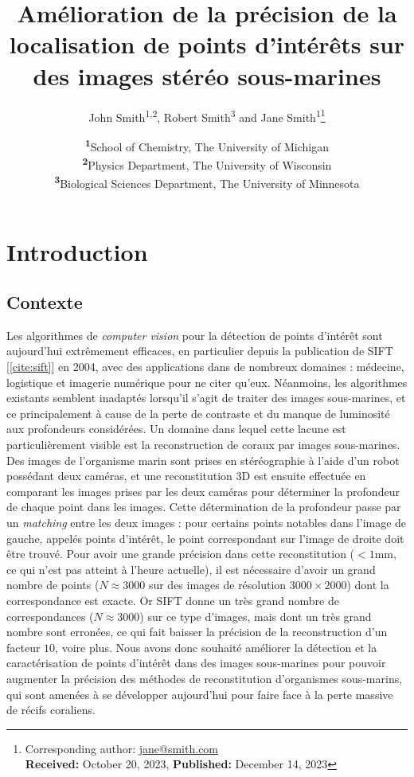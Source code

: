 \documentclass[
	a4paper, %
	10pt, %
	unnumberedsections, %
	twoside, %
]{LTJournalArticle}
\title{Amélioration de la précision de la localisation de points d'intérêts sur des images stéréo sous-marines} %
\author{%
	John Smith\textsuperscript{1,2}, Robert Smith\textsuperscript{3} and Jane Smith\textsuperscript{1}\thanks{Corresponding author: \href{mailto:jane@smith.com}{jane@smith.com}\\ \textbf{Received:} October 20, 2023, \textbf{Published:} December 14, 2023}
}
\date{\footnotesize\textsuperscript{\textbf{1}}School of Chemistry, The University of Michigan\\ \textsuperscript{\textbf{2}}Physics Department, The University of Wisconsin\\ \textsuperscript{\textbf{3}}Biological Sciences Department, The University of Minnesota}
\begin{document}
\maketitle %


\section{Introduction}

\subsection{Contexte}

Les algorithmes de \textit{computer vision} pour la détection de points d'intérêt sont aujourd'hui extrêmement efficaces, en particulier depuis la publication de SIFT [\ref{cite:sift}] en 2004, avec des applications dans de nombreux domaines : médecine, logistique et imagerie numérique pour ne citer qu'eux.
Néanmoins, les algorithmes existants semblent inadaptés lorsqu'il s'agit de traiter des images sous-marines, et ce principalement à cause de la perte de contraste et du manque de luminosité aux profondeurs considérées.
Un domaine dans lequel cette lacune est particulièrement visible est la reconstruction de coraux par images sous-marines. Des images de l'organisme marin sont prises en stéréographie à l'aide d'un robot possédant deux caméras, et une reconstitution 3D est ensuite effectuée en comparant les images prises par les deux caméras pour déterminer la profondeur de chaque point dans les images.
Cette détermination de la profondeur passe par un \textit{matching} entre les deux images : pour certains points notables dans l'image de gauche, appelés points d'intérêt, le point correspondant sur l'image de droite doit être trouvé.
Pour avoir une grande précision dans cette reconstitution ($< 1$mm, ce qui n'est pas atteint à l'heure actuelle), il est nécessaire d'avoir un grand nombre de points ($N \approx 3000$ sur des images de résolution $3000 \times 2000$) dont la correspondance est exacte.
Or SIFT donne un très grand nombre de correspondances ($N \approx 3000$) sur ce type d'images, mais dont un très grand nombre sont erronées, ce qui fait baisser la précision de la reconstruction d'un facteur $10$, voire plus.
Nous avons donc souhaité améliorer la détection et la caractérisation de points d'intérêt dans des images sous-marines pour pouvoir augmenter la précision des méthodes de reconstitution d'organismes sous-marins, qui sont amenées à se développer aujourd'hui pour faire face à la perte massive de récifs coraliens.
\end{document}
